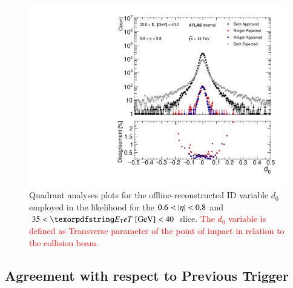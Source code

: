 \begin{figure}[h!tb]
\centering
\includegraphics[width=.5\textwidth]{sections/analyses/figures/quadrant_plots/HLT_e28_lhtight_nod0_noringer_ivarloose_HLT_e28_lhtight_nod0_ivarloose_trackd0pvunbiased_et4_eta1.pdf}




\caption{\label{fig:quadrant_track_variables_30GeV}
Quadrant analyses plots for the offline-reconstructed ID variable $d_0$ employed in the
likelihood for the $0.6<\abseta{}<0.8$ and $35<\et{}~[\text{GeV}]<40$ slice. \textcolor{red}{The $d_0$ variable is defined as Transverse parameter of the point of impact in relation to the collision beam.} 
}
\end{figure}

\FloatBarrier
\subsection[Agreement with respect to Previous
Trigger]{Agreement with respect to Previous Trigger}\label{ssec:agreement}


